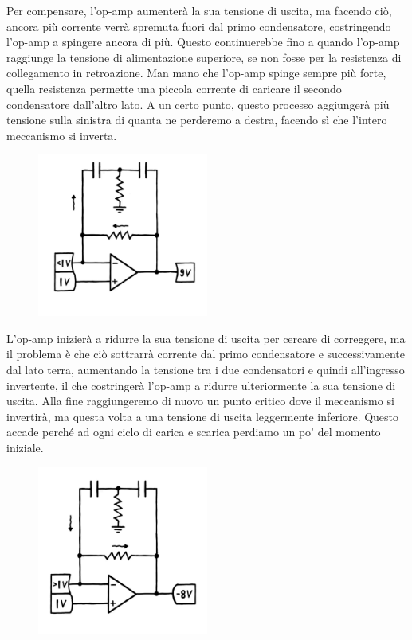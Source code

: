 \documentclass{article}
\theoremstyle{definition}
\begin{document}
Per compensare, l'op-amp aumenterà la sua tensione di uscita, ma facendo ciò, ancora più corrente verrà spremuta fuori dal primo condensatore, costringendo l'op-amp a spingere ancora di più.
Questo continuerebbe fino a quando l'op-amp raggiunge la tensione di alimentazione superiore, se non fosse per la resistenza di collegamento in retroazione.
Man mano che l'op-amp spinge sempre più forte, quella resistenza permette una piccola corrente di caricare il secondo condensatore dall'altro lato.
A un certo punto, questo processo aggiungerà più tensione sulla sinistra di quanta ne perderemo a destra, facendo sì che l'intero meccanismo si inverta.

\begin{figure}[ht]
    \centering
    \includegraphics[width=0.5\textwidth]{../images/Toscillator3.png} 
    \label{fig:Toscillator3}
\end{figure}


L'op-amp inizierà a ridurre la sua tensione di uscita per cercare di correggere, ma il problema è che ciò sottrarrà corrente dal primo condensatore e successivamente dal lato terra, aumentando la tensione tra i due condensatori e quindi all'ingresso invertente, il che costringerà l'op-amp a ridurre ulteriormente la sua tensione di uscita.
Alla fine raggiungeremo di nuovo un punto critico dove il meccanismo si invertirà, ma questa volta a una tensione di uscita leggermente inferiore.
Questo accade perché ad ogni ciclo di carica e scarica perdiamo un po' del momento iniziale. 

\begin{figure}[ht]
    \centering
    \includegraphics[width=0.5\textwidth]{../images/Toscillator4.png} 
    \label{fig:Toscillator4}
\end{figure}
\end{document}
